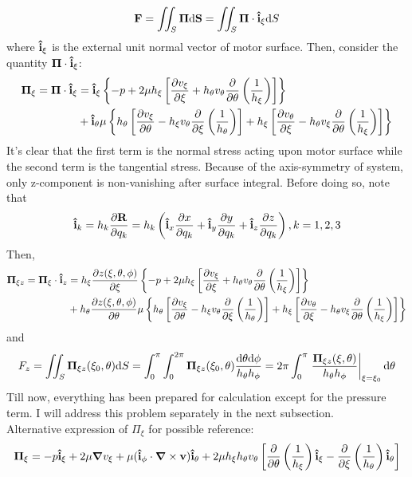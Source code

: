 \documentclass[fontsize=11pt, %
                             paper=a4, %
                             twoside, %
                             captions=tableheading,
                             index=totoc,
                             hyperref]{labbook}
\begin{document}
\begin{equation}
\mathbf{F}=\iint_S \mbox{\boldmath$ \Pi $} \mathrm{d}\mathbf{S}=\iint_S \mbox{\boldmath$ \Pi $} \cdot \mathbf{\hat{i}}_\xi \mathrm{d}S
\end{equation}
where $\mathbf{\hat{i}}_\xi$ is the external unit normal vector of motor surface. Then, consider the quantity $\mbox{\boldmath$ \Pi $} \cdot \mathbf{\hat{i}}_\xi$:
\begin{equation}
\begin{aligned}
\mbox{\boldmath$ \Pi $}_\xi=\mbox{\boldmath$ \Pi $} \cdot \mathbf{\hat{i}}_\xi&=
\mathbf{\hat{i}}_\xi \left\{-p+2\mu h_\xi \left[\frac{\partial v_\xi}{\partial \xi}+h_\theta v_\theta \frac{\partial }{\partial \theta}\left(\frac{1}{h_\xi}\right)\right]\right\}\\
&+\mathbf{\hat{i}}_\theta \mu \left\{h_\theta\left[\frac{\partial v_\xi}{\partial \theta}-h_\xi v_\theta \frac{\partial }{\partial \xi}\left(\frac{1}{h_\theta}\right)\right]+h_\xi\left[\frac{\partial v_\theta}{\partial \xi}-h_\theta v_\xi \frac{\partial }{\partial \theta}\left(\frac{1}{h_\xi}\right)\right]\right\}
\end{aligned}
\end{equation}
It's clear that the first term is the normal stress acting upon motor surface while the second term is the tangential stress. Because of the axis-symmetry of system, only z-component is non-vanishing after surface integral. Before doing so, note that
\begin{equation}
\mathbf{\hat{i}}_k=h_k \frac{\partial \mathbf{R}}{\partial q_k}=h_k\left(\mathbf{\hat{i}}_x \frac{\partial x}{\partial q_k} + \mathbf{\hat{i}}_y \frac{\partial y}{\partial q_k} +\mathbf{\hat{i}}_z \frac{\partial z}{\partial q_k}\right), k=1,2,3
\end{equation}
Then,
\begin{equation}\label{eqn_stressz}
\begin{aligned}
\mbox{\boldmath$ \Pi $}_{\xi z}=\mbox{\boldmath$ \Pi $}_\xi \cdot \mathbf{\hat{i}}_z&=
h_\xi\frac{\partial z(\xi,\theta,\phi)}{\partial \xi} \left\{-p+2\mu h_\xi \left[\frac{\partial v_\xi}{\partial \xi}+h_\theta v_\theta \frac{\partial }{\partial \theta}\left(\frac{1}{h_\xi}\right)\right]\right\}\\
&+h_\theta\frac{\partial z(\xi,\theta,\phi)}{\partial \theta} \mu \left\{h_\theta\left[\frac{\partial v_\xi}{\partial \theta}-h_\xi v_\theta \frac{\partial }{\partial \xi}\left(\frac{1}{h_\theta}\right)\right]+h_\xi\left[\frac{\partial v_\theta}{\partial \xi}-h_\theta v_\xi \frac{\partial }{\partial \theta}\left(\frac{1}{h_\xi}\right)\right]\right\}\\
\end{aligned}
\end{equation}
and
\begin{equation}\label{eqn_forcez}
F_z=\iint_S\mbox{\boldmath$ \Pi $}_{\xi z}(\xi_0,\theta)\mathrm{d}S=\int_0^\pi\int_0^{2\pi} \mbox{\boldmath$ \Pi $}_{\xi z}(\xi_0,\theta)\frac{\mathrm{d}\theta\mathrm{d}\phi}{h_\theta h_\phi}=2\pi\int_0^\pi \left.\frac{\mbox{\boldmath$ \Pi $}_{\xi z}(\xi,\theta)}{h_\theta h_\phi}\right|_{\xi=\xi_0}\mathrm{d}\theta
\end{equation}
Till now, everything has been prepared for calculation except for the pressure term. I will address this problem separately in the next subsection.\\
Alternative expression of $\Pi_\xi$ for possible reference:
\begin{equation}
\mbox{\boldmath$ \Pi $}_\xi=-p\mathbf{\hat{i}}_\xi + 2\mu \mbox{\boldmath$ \nabla $} v_\xi+\mu  (\mathbf{\hat{i}}_\phi \cdot \mbox{\boldmath$ \nabla $} \times \mathbf{v})\mathbf{\hat{i}}_\theta+2\mu h_\xi h_\theta v_\theta\left[\frac{\partial }{\partial \theta}\left(\frac{1}{h_\xi}\right)\mathbf{\hat{i}}_\xi - \frac{\partial }{\partial \xi}\left(\frac{1}{h_\theta}\right)\mathbf{\hat{i}}_\theta\right]
\end{equation}
\end{document}
